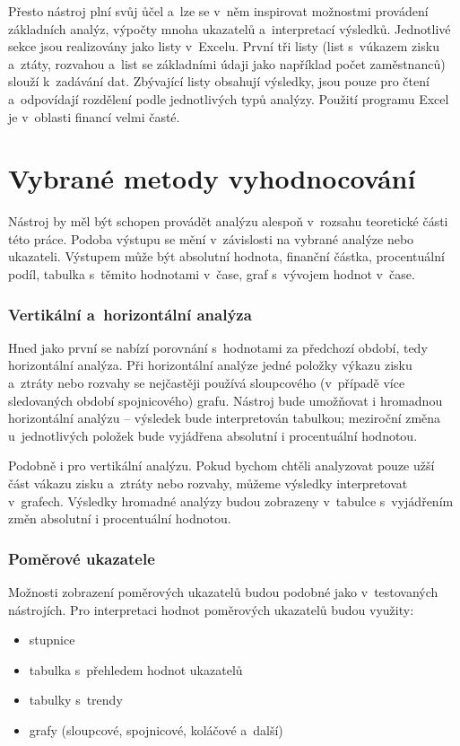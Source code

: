 Přesto nástroj plní svůj ůčel a~lze se v~něm inspirovat možnostmi provádení základních analýz, výpočty mnoha ukazatelů a~interpretací výsledků. Jednotlivé sekce jsou realizovány jako listy v~Excelu. První tři listy (list s~vúkazem zisku a~ztáty, rozvahou a~list se základními údaji jako například počet zaměstnanců) slouží k~zadávání dat. Zbývající listy obsahují výsledky, jsou pouze pro čtení a~odpovídají rozdělení podle jednotlivých typů analýzy. Použití programu Excel je v~oblasti financí velmi časté.



\section{Vybrané metody vyhodnocování}
Nástroj by měl být schopen provádět analýzu alespoň v~rozsahu teoretické části této práce. Podoba výstupu se mění v~závislosti na vybrané analýze nebo ukazateli. Výstupem může být absolutní hodnota, finanční částka, procentuální podíl, tabulka s~těmito hodnotami v~čase, graf s~vývojem hodnot v~čase. 


\subsubsection{Vertikální a~horizontální analýza}
Hned jako první se nabízí porovnání s~hodnotami za předchozí období, tedy horizontální analýza. Při horizontální analýze jedné položky výkazu zisku a~ztráty nebo rozvahy se nejčastěji používá sloupcového (v~případě více sledovaných období spojnicového) grafu. Nástroj bude umožňovat i hromadnou horizontální analýzu -- výsledek bude interpretován tabulkou; meziroční změna u~jednotlivých položek bude vyjádřena absolutní i procentuální hodnotou. 

Podobně i pro vertikální analýzu. Pokud bychom chtěli analyzovat pouze užší část vákazu zisku a~ztráty nebo rozvahy, můžeme výsledky interpretovat v~grafech. Výsledky hromadné analýzy budou zobrazeny v~tabulce s~vyjádřením změn absolutní i procentuální hodnotou.

\subsubsection{Poměrové ukazatele}
Možnosti zobrazení poměrových ukazatelů budou podobné jako v~testovaných nástrojích.
Pro interpretaci hodnot poměrových ukazatelů budou využity:
\begin{itemize}
	\item stupnice
	\item tabulka s~přehledem hodnot ukazatelů
	\item tabulky s~trendy
	\item grafy (sloupcové, spojnicové, koláčové a~další)
\end{itemize}

